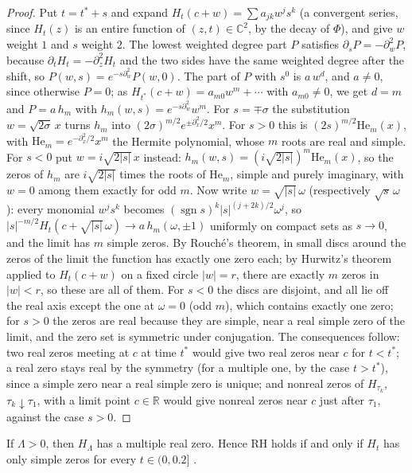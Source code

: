 \begin{proof}
Put $t=t^*+s$ and expand $H_t(c+w)=\sum a_{jk}w^js^k$ (a convergent series, since $H_t(z)$ is an entire function of $(z,t)\in\mathbb C^2$, by the decay of $\Phi$), and give $w$ weight $1$ and $s$ weight $2$. The lowest weighted degree part $P$ satisfies $\partial_sP=-\partial_w^2P$, because $\partial_tH_t=-\partial_z^2H_t$ and the two sides have the same weighted degree after the shift, so $P(w,s)=e^{-s\partial_w^2}P(w,0)$. The part of $P$ with $s^0$ is $a\,w^d$, and $a\ne0$, since otherwise $P=0$; as $H_{t^*}(c+w)=a_{m0}w^m+\cdots$ with $a_{m0}\ne0$, we get $d=m$ and $P=a\,h_m$ with $h_m(w,s)=e^{-s\partial_w^2}w^m$. For $s=\mp\sigma$ the substitution $w=\sqrt{2\sigma}\,x$ turns $h_m$ into $(2\sigma)^{m/2}e^{\pm\partial_x^2/2}x^m$. For $s>0$ this is $(2s)^{m/2}\mathrm{He}_m(x)$, with $\mathrm{He}_m=e^{-\partial_x^2/2}x^m$ the Hermite polynomial, whose $m$ roots are real and simple. For $s<0$ put $w=i\sqrt{2|s|}\,x$ instead: $h_m(w,s)=(i\sqrt{2|s|})^m\mathrm{He}_m(x)$, so the zeros of $h_m$ are $i\sqrt{2|s|}$ times the roots of $\mathrm{He}_m$, simple and purely imaginary, with $w=0$ among them exactly for odd $m$. Now write $w=\sqrt{|s|}\,\omega$ (respectively $\sqrt s\,\omega$): every monomial $w^js^k$ becomes $(\operatorname{sgn}s)^k|s|^{(j+2k)/2}\omega^j$, so $|s|^{-m/2}H_t(c+\sqrt{|s|}\,\omega)\to a\,h_m(\omega,\pm1)$ uniformly on compact sets as $s\to0$, and the limit has $m$ simple zeros. By Rouch\'e's theorem, in small discs around the zeros of the limit the function has exactly one zero each; by Hurwitz's theorem applied to $H_t(c+w)$ on a fixed circle $|w|=r$, there are exactly $m$ zeros in $|w|<r$, so these are all of them. For $s<0$ the discs are disjoint, and all lie off the real axis except the one at $\omega=0$ (odd $m$), which contains exactly one zero; for $s>0$ the zeros are real because they are simple, near a real simple zero of the limit, and the zero set is symmetric under conjugation. The consequences follow: two real zeros meeting at $c$ at time $t^*$ would give two real zeros near $c$ for $t<t^*$; a real zero stays real by the symmetry (for a multiple one, by the case $t>t^*$), since a simple zero near a real simple zero is unique; and nonreal zeros of $H_{\tau_k}$, $\tau_k\downarrow\tau_1$, with a limit point $c\in\mathbb R$ would give nonreal zeros near $c$ just after $\tau_1$, against the case $s>0$.
\end{proof}

\begin{corollary}\label{ft:cor:collide}
If $\Lambda>0$, then $H_\Lambda$ has a multiple real zero. Hence RH holds if and only if $H_t$ has only simple zeros for every $t\in(0,0.2]$ \cite{P26path}.
\end{corollary}

